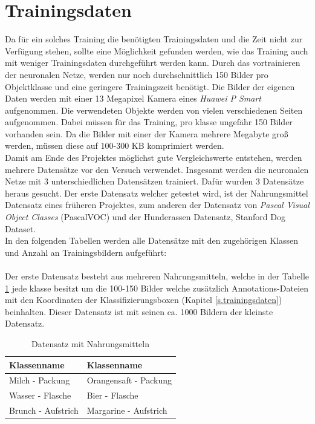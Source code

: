   \section{Trainingsdaten}\label{s.tdaten}
Da für ein solches Training die benötigten Trainingsdaten und die Zeit nicht zur Verfügung stehen, sollte eine Möglichkeit gefunden werden, wie das Training auch mit weniger Trainingsdaten durchgeführt werden kann. Durch das vortrainieren der neuronalen Netze, werden nur noch durchschnittlich 150 Bilder pro Objektklasse und eine geringere Trainingszeit benötigt. Die Bilder der eigenen Daten werden mit einer 13 Megapixel Kamera eines \textit{Huawei P Smart} aufgenommen. Die verwendeten Objekte werden von vielen verschiedenen Seiten aufgenommen. Dabei müssen für das Training, pro klasse ungefähr 150 Bilder vorhanden sein. Da die Bilder mit einer der Kamera mehrere Megabyte groß werden, müssen diese auf 100-300 KB komprimiert werden.\\
Damit am Ende des Projektes möglichst gute Vergleichswerte entstehen, werden mehrere Datensätze vor den Versuch verwendet. Insgesamt werden die neuronalen Netze mit 3 unterschiedlichen Datensätzen trainiert. Dafür wurden 3 Datensätze heraus gesucht. Der erste Datensatz welcher getestet wird, ist der Nahrungsmittel Datensatz eines früheren Projektes, zum anderen der Datensatz von \textit{Pascal Visual Object Classes} (PascalVOC) und der Hunderassen Datensatz, Stanford Dog Dataset.\\
In den folgenden Tabellen werden alle Datensätze mit den zugehörigen Klassen und Anzahl an Trainingsbildern aufgeführt:\\\\
Der erste Datensatz besteht aus mehreren Nahrungsmitteln, welche in der Tabelle \ref{tab:nahrungsmittel} jede klasse besitzt um die 100-150 Bilder welche zusätzlich Annotations-Dateien mit den Koordinaten der Klassifizierungsboxen (Kapitel \ref{s.trainingsdaten}) beinhalten. Dieser Datensatz ist mit seinen ca. 1000 Bildern der kleinste Datensatz. 
\begin{table}
[h]
\caption{Datensatz mit Nahrungsmitteln}
\centering
\begin{tabular}{|l|l|}
\hline
Klassenname & Klassenname\\
\hline
Milch - Packung & Orangensaft - Packung\\
Wasser - Flasche & Bier - Flasche\\
Brunch - Aufstrich & Margarine - Aufstrich\\
\hline
\end{tabular}
\label{tab:nahrungsmittel}
\end{table}
